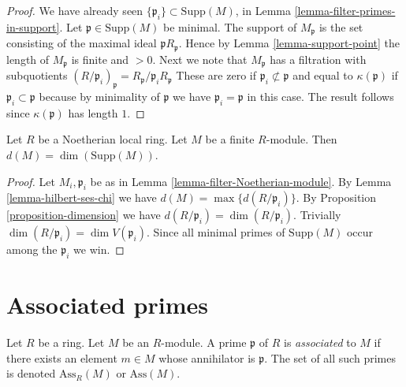 \begin{proof}
We have already seen $\{\mathfrak p_i\} \subset \text{Supp}(M)$,
in Lemma \ref{lemma-filter-primes-in-support}.
Let $\mathfrak p \in \text{Supp}(M)$ be minimal.
The support of $M_{\mathfrak p}$ is the set
consisting of the maximal ideal $\mathfrak p R_{\mathfrak p}$.
Hence by Lemma \ref{lemma-support-point} the length
of $M_{\mathfrak p}$ is finite and $>0$. Next we
note that $M_{\mathfrak p}$ has a filtration with subquotients
$
(R/\mathfrak p_i)_{\mathfrak p}
=
R_{\mathfrak p}/{\mathfrak p_i}R_{\mathfrak p}
$
These are zero if $\mathfrak p_i \not \subset \mathfrak p$
and equal to $\kappa(\mathfrak p)$ if $\mathfrak p_i \subset
\mathfrak p$ because by minimality of $\mathfrak p$
we have $\mathfrak p_i = \mathfrak p$ in this case.
The result follows since $\kappa(\mathfrak p)$ has length $1$.
\end{proof}

\begin{lemma}
\label{lemma-support-dimension-d}
Let $R$ be a Noetherian local ring.
Let $M$ be a finite $R$-module.
Then $d(M) = \dim(\text{Supp}(M))$.
\end{lemma}

\begin{proof}
Let $M_i, \mathfrak p_i$ be as in Lemma \ref{lemma-filter-Noetherian-module}.
By Lemma \ref{lemma-hilbert-ses-chi} we have
$d(M) = \max \{ d(R/\mathfrak p_i) \}$. By
Proposition \ref{proposition-dimension} we have
$d(R/\mathfrak p_i) = \dim(R/\mathfrak p_i)$.
Trivially $\dim(R/\mathfrak p_i) = \dim V(\mathfrak p_i)$.
Since all minimal primes of $\text{Supp}(M)$ occur among
the $\mathfrak p_i$ we win.
\end{proof}











\section{Associated primes}
\label{section-ass}

\begin{definition}
\label{definition-associated}
Let $R$ be a ring. Let $M$ be an $R$-module.
A prime $\mathfrak p$ of $R$ is {\it associated} to $M$
if there exists an element $m \in M$ whose annihilator
is $\mathfrak p$.
The set of all such primes is denoted $\text{Ass}_R(M)$
or $\text{Ass}(M)$.
\end{definition}

